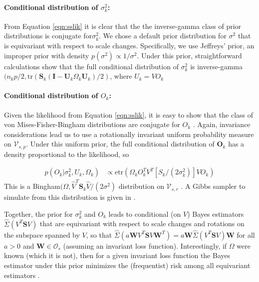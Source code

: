 \documentclass[12pt]{article}
\newcommand{\bl}[1]{{\mathbf #1}}
\newcommand{\tr}{\text{tr}}
\newcommand{\etr}{\text{etr}}
\begin{document}
\paragraph{Conditional distribution of $\sigma_k^2$:}

From Equation \ref{eqn:sslik} it is clear that the the inverse-gamma
class of prior distributions is conjugate for$\sigma_k^2$.  We chose a
default prior distribution for $\sigma^2$ that is equivariant with
respect to scale changes.  Specifically, we use Jeffreys' prior, an
improper prior with density $p(\sigma^2) \propto 1/\sigma^2 $.  Under
this prior, straightforward calculations show that the full
conditional distribution of $\sigma_k^2$ is
inverse-gamma$( n_k p/2 , \tr(\bl S_k(\bl I -\bl U_k\Omega_k\bl
U_k)/2)$, where $U_k = VO_k$

\paragraph{Conditional distribution of $O_k$:} Given the likelihood
from Equation \ref{eqn:sslik}, it is easy to show that the class of
von Mises-Fisher-Bingham distributions are conjugate for $O_k$
\citep{Hoff2009, Hoff2012}.  Again, invariance considerations
lead us to use a rotationally invariant uniform probability measure on
$\mathcal V_{s,p}$.  Under this uniform prior, the full conditional
distribution of $\bl O_k$ has a density proportional to the
likelihood, so

\begin{align}
\label{lik_vo}
 p(O_k | \sigma^2_k, U_k, \Omega_k) & \propto \etr(\Omega_kO^T_kV^T[S_k/(2\sigma^2_k)]VO_k)
\end{align}
%
\noindent This is a Bingham$(\Omega, \hat{V}^T \bl S_k \hat{V}/(2\sigma^2)$
distribution on $\mathcal V_{s, r}$ \citep{Khatri1977}. A
Gibbs sampler to simulate from this distribution is given in
\citet{Hoff2012}.  

Together, the prior for $\sigma_k^2$ and $O_k$ leads to conditional
(on $V$) Bayes estimators $\hat \Sigma(V^T \bl S V)$ that are
equivariant with respect to scale changes and rotations on the
subspace spanned by $V$, so
that $\hat \Sigma(a \bl W V^T \bl S V \bl W^T) = a \bl W \hat\Sigma(V^T
\bl S V) \bl W$
for all $a>0$ and $\bl W\in \mathcal O_{s}$ (assuming an invariant
loss function). Interestingly, if $\Omega$ were known (which it is
not), then for a given invariant loss function the Bayes estimator
under this prior minimizes the (frequentist) risk among all
equivariant estimators \citep{Eaton1989}.
\end{document}
